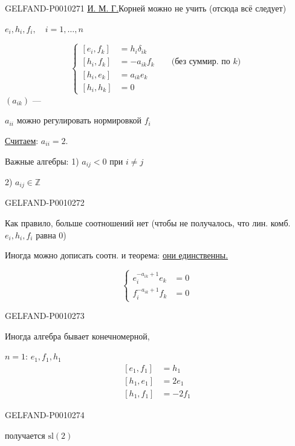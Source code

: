 \begin{GelfandAdjacentEvidence}{GELFAND-P001027}{1}
\underline{\underline{И. М. Г.}}\quad {}\quad Корней можно не учить (отсюда всё следует)

$e_i,h_i,f_i,\quad i=1,\ldots,n$

\begin{equation*}
\left\{\begin{aligned}
[e_i,f_k]&=h_i\delta_{ik}\\
[h_i,f_k]&=-a_{ik}f_k\qquad\text{(без суммир. по $k$)}\\
[h_i,e_k]&=a_{ik}e_k\\
[h_i,h_k]&=0
\end{aligned}\right.
\tag{1}
\end{equation*}
$(a_{ik})$ --- 

$a_{ii}$ можно регулировать нормировкой $f_i$

\underline{Считаем}: $a_{ii}=2$.

Важные алгебры: 1) $a_{ij}<0$ при $i\ne j$

\hspace{4em}2) $a_{ij}\in\mathbb Z$
\end{GelfandAdjacentEvidence}
\begin{GelfandAdjacentEvidence}{GELFAND-P001027}{2}


Как правило, больше соотношений нет (чтобы не получалось, что лин. комб. $e_i,h_i,f_i$ равна $0$)

Иногда можно дописать соотн. и теорема: \underline{они единственны.}

\begin{equation*}
\left\{\begin{aligned}
e_i^{-a_{ik}+1}e_k&=0\\
f_i^{-a_{ik}+1}f_k&=0
\end{aligned}\right.
\tag{2}
\end{equation*}
\end{GelfandAdjacentEvidence}
\begin{GelfandAdjacentEvidence}{GELFAND-P001027}{3}


Иногда алгебра бывает конечномерной,

\underline{$n=1$}: \quad $e_1,f_1,h_1$
\[
\begin{aligned}
[e_1,f_1]&=h_1\\
[h_1,e_1]&=2e_1\\
[h_1,f_1]&=-2f_1
\end{aligned}
\]
\end{GelfandAdjacentEvidence}
\begin{GelfandAdjacentEvidence}{GELFAND-P001027}{4}


получается $\mathrm{sl}(2)$
\end{GelfandAdjacentEvidence}


